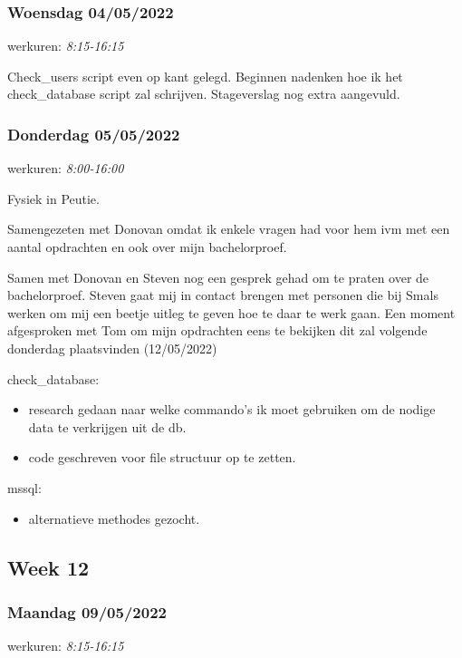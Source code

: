 \subsubsection{Woensdag 04/05/2022}

werkuren: \emph{8:15-16:15}

Check\_users script even op kant gelegd. Beginnen nadenken hoe ik het check\_database script zal schrijven. Stageverslag nog extra aangevuld.


\subsubsection{Donderdag 05/05/2022}

werkuren: \emph{8:00-16:00}

Fysiek in Peutie.

Samengezeten met Donovan omdat ik enkele vragen had voor hem ivm met een aantal opdrachten en ook over mijn bachelorproef.

Samen met Donovan en Steven nog een gesprek gehad om te praten over de bachelorproef. Steven gaat mij in contact brengen met personen die bij Smals werken om mij een beetje uitleg te geven hoe te daar te werk gaan.
Een moment afgesproken met Tom om mijn opdrachten eens te bekijken dit zal volgende donderdag plaatsvinden (12/05/2022)

check\_database:

\begin{itemize}
    \item research gedaan naar welke commando's ik moet gebruiken om de nodige data te verkrijgen uit de db.
    \item code geschreven voor file structuur op te zetten.
\end{itemize}

mssql:

\begin{itemize}
    \item alternatieve methodes gezocht.
\end{itemize}

\subsection{Week 12}

\subsubsection{Maandag 09/05/2022}

werkuren: \emph{8:15-16:15}

